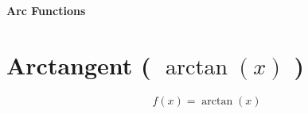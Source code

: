 \begingroup
\begin{center}
\fontsize{15}{15}\sffamily\selectfont
\textbf{Arc Functions}
\end{center}
\endgroup



\section{Arctangent ( $\arctan(x)$ ) \cite{wiki-Inverse_trigonometric_functions}} \label{Arctangent}
\[
    f(x)=\arctan(x)
\]

